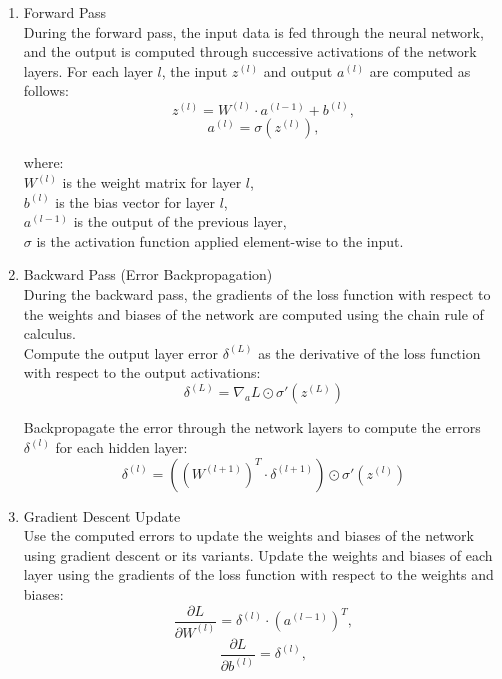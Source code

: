 \documentclass[12pt]{article}
\begin{document}
    \newpage
    \begin{enumerate}
    \item Forward Pass\\
    During the forward pass, the input data is fed through the neural network, and the output
    is computed through successive activations of the network layers.
    For each layer \( l \), the input \( z^{(l)} \) and output \( a^{(l)} \) are computed as follows:
    \begin{equation}
        z^{(l)} = W^{(l)} \cdot a^{(l-1)} + b^{(l)},
    \end{equation}
    \begin{equation}
        a^{(l)} = \sigma(z^{(l)}),
    \end{equation}

    where:\\
    \( W^{(l)} \) is the weight matrix for layer \( l \),\\
    \( b^{(l)} \) is the bias vector for layer \( l \),\\
    \( a^{(l-1)} \) is the output of the previous layer,\\
    \( \sigma \) is the activation function applied element-wise to the input.\\
    \item Backward Pass (Error Backpropagation)\\
    During the backward pass, the gradients of the loss function with respect to the weights and biases of the network are computed using the chain rule of calculus.
    \\
    Compute the output layer error \( \delta^{(L)} \) as the derivative of the loss function with respect to the output activations:
    \begin{equation}
        \delta^{(L)} = \nabla_a L \odot \sigma'(z^{(L)})
    \end{equation}

    Backpropagate the error through the network layers to compute the errors \( \delta^{(l)} \) for each hidden layer:
    \begin{equation}
        \delta^{(l)} = ((W^{(l+1)})^T \cdot \delta^{(l+1)}) \odot \sigma'(z^{(l)})
    \end{equation}
    \item Gradient Descent Update\\
    Use the computed errors to update the weights and biases of the network using gradient descent or its variants. 
    Update the weights and biases of each layer using the gradients of the loss function with respect to the weights and biases:
    \newpage
    \begin{equation}
        \frac{\partial L}{\partial W^{(l)}} = \delta^{(l)} \cdot (a^{(l-1)})^T,
    \end{equation}
    \begin{equation}
        \frac{\partial L}{\partial b^{(l)}} = \delta^{(l)},
    \end{equation}


\end{enumerate}
\end{document}
